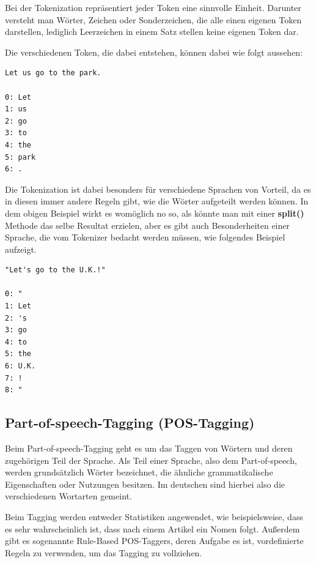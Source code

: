 Bei der Tokenization repräsentiert jeder Token eine sinnvolle Einheit.
Darunter versteht man Wörter, Zeichen oder Sonderzeichen, die alle einen eigenen Token darstellen, lediglich Leerzeichen in einem Satz stellen keine eigenen Token dar.\cite{machineLearningTextAnalysis, naturalLanguageProcessing}

Die verschiedenen Token, die dabei entstehen, können dabei wie folgt aussehen:

\begin{lstlisting}[label={lst: Tokenization}]
Let us go to the park.

0: Let
1: us
2: go
3: to
4: the
5: park
6: .
\end{lstlisting}

Die Tokenization ist dabei besonders für verschiedene Sprachen von Vorteil, da es in diesen immer andere Regeln gibt, wie die Wörter aufgeteilt werden können.
In dem obigen Beispiel wirkt es womöglich no so, als könnte man mit einer \textbf{split()} Methode das selbe Resultat erzielen, aber es gibt auch Besonderheiten einer Sprache, die vom Tokenizer bedacht werden müssen, wie folgendes Beispiel aufzeigt.\cite{machineLearningTextAnalysis, naturalLanguageProcessing}

\begin{lstlisting}[label={lst: Tokenization Ausnahme}]
"Let's go to the U.K.!"

0: "
1: Let
2: 's
3: go
4: to
5: the
6: U.K.
7: !
8: "
\end{lstlisting}

\subsection{Part-of-speech-Tagging (POS-Tagging)}

Beim Part-of-speech-Tagging geht es um das Taggen von Wörtern und deren zugehörigen Teil der Sprache.
Als Teil einer Sprache, also dem Part-of-speech, werden grundsätzlich Wörter bezeichnet, die ähnliche grammatikalische Eigenschaften oder Nutzungen besitzen.
Im deutschen sind hierbei also die verschiedenen Wortarten gemeint.

Beim Tagging werden entweder Statistiken angewendet, wie beispielsweise, dass es sehr wahrscheinlich ist, dass nach einem Artikel ein Nomen folgt.
Außerdem gibt es sogenannte Rule-Based POS-Taggers, deren Aufgabe es ist, vordefinierte Regeln zu verwenden, um das Tagging zu vollziehen.\cite{machineLearningTextAnalysis, naturalLanguageProcessing}

